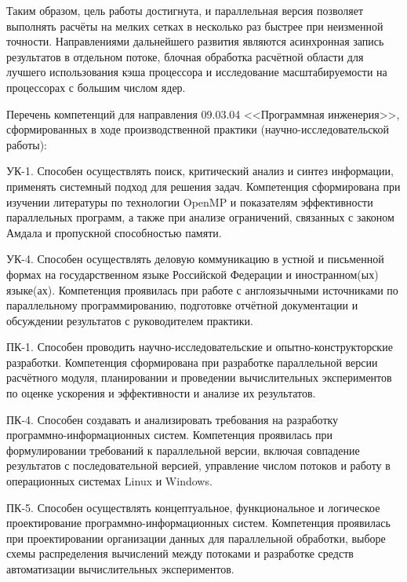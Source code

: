 Таким образом, цель работы достигнута, и параллельная версия позволяет выполнять расчёты на мелких сетках в несколько раз быстрее при неизменной точности. Направлениями дальнейшего развития являются асинхронная запись результатов в отдельном потоке, блочная обработка расчётной области для лучшего использования кэша процессора и исследование масштабируемости на процессорах с большим числом ядер.


Перечень компетенций для направления 09.03.04 <<Программная инженерия>>, сформированных в ходе производственной практики (научно-исследовательской работы):

УК-1. Способен осуществлять поиск, критический анализ и синтез информации, применять системный подход для решения задач. Компетенция сформирована при изучении литературы по технологии OpenMP и показателям эффективности параллельных программ, а также при анализе ограничений, связанных с законом Амдала и пропускной способностью памяти.

УК-4. Способен осуществлять деловую коммуникацию в устной и письменной формах на государственном языке Российской Федерации и иностранном(ых) языке(ах). Компетенция проявилась при работе с англоязычными источниками по параллельному программированию, подготовке отчётной документации и обсуждении результатов с руководителем практики.

ПК-1. Способен проводить научно-исследовательские и опытно-конструкторские разработки. Компетенция сформирована при разработке параллельной версии расчётного модуля, планировании и проведении вычислительных экспериментов по оценке ускорения и эффективности и анализе их результатов.

ПК-4. Способен создавать и анализировать требования на разработку программно-информационных систем. Компетенция проявилась при формулировании требований к параллельной версии, включая совпадение результатов с последовательной версией, управление числом потоков и работу в операционных системах Linux и Windows.

ПК-5. Способен осуществлять концептуальное, функциональное и логическое проектирование программно-информационных систем. Компетенция проявилась при проектировании организации данных для параллельной обработки, выборе схемы распределения вычислений между потоками и разработке средств автоматизации вычислительных экспериментов.
